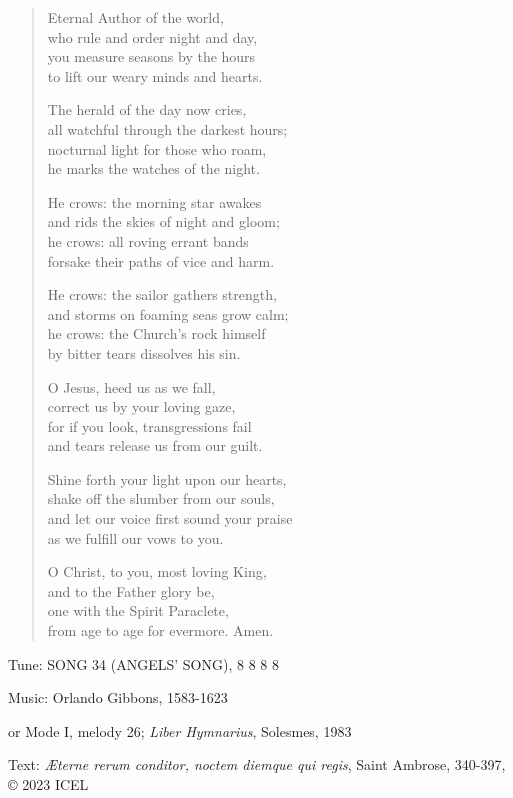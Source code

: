 \hymn


\begin{verse}
Eternal Author of the world,\\
who rule and order night and day,\\
you measure seasons by the hours\\
to lift our weary minds and hearts.

The herald of the day now cries,\\
all watchful through the darkest hours;\\
nocturnal light for those who roam,\\
he marks the watches of the night.

He crows: the morning star awakes\\
and rids the skies of night and gloom;\\
he crows: all roving errant bands\\
forsake their paths of vice and harm.

He crows: the sailor gathers strength,\\
and storms on foaming seas grow calm;\\
he crows: the Church’s rock himself\\
by bitter tears dissolves his sin.

O Jesus, heed us as we fall,\\
correct us by your loving gaze,\\
for if you look, transgressions fail\\
and tears release us from our guilt.

Shine forth your light upon our hearts,\\
shake off the slumber from our souls,\\
and let our voice first sound your praise\\
as we fulfill our vows to you.

O Christ, to you, most loving King,\\
and to the Father glory be,\\
one with the Spirit Paraclete,\\
from age to age for evermore. Amen.
\end{verse}

\begin{hymnsource}
Tune: SONG 34 (ANGELS’ SONG), 8 8 8 8

Music: Orlando Gibbons, 1583-1623

or Mode I, melody 26; \emph{Liber Hymnarius}, Solesmes, 1983

Text: \emph{Æterne rerum conditor, noctem diemque qui regis}, Saint Ambrose, 340-397, © 2023 ICEL
\end{hymnsource}
